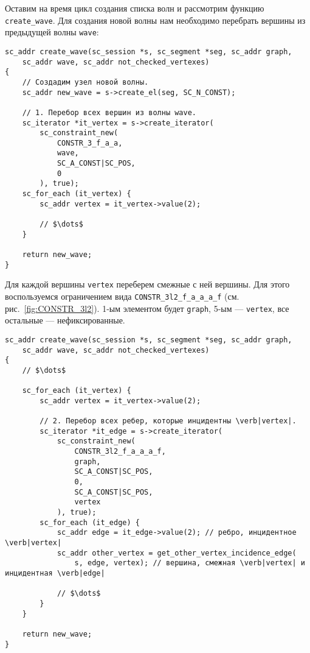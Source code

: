 Оставим на время цикл создания списка волн и рассмотрим функцию
\lstinline|create_wave|. Для создания новой волны нам необходимо
перебрать вершины из предыдущей волны \lstinline|wave|:

\begin{lstlisting}[texcl]
sc_addr create_wave(sc_session *s, sc_segment *seg, sc_addr graph,
    sc_addr wave, sc_addr not_checked_vertexes)
{
    // Создадим узел новой волны.
    sc_addr new_wave = s->create_el(seg, SC_N_CONST);

    // 1. Перебор всех вершин из волны wave.
    sc_iterator *it_vertex = s->create_iterator(
        sc_constraint_new(
            CONSTR_3_f_a_a,
            wave,
            SC_A_CONST|SC_POS,
            0
        ), true);
    sc_for_each (it_vertex) {
        sc_addr vertex = it_vertex->value(2);

        // $\dots$
    }

    return new_wave;
}
\end{lstlisting}

Для каждой вершины \lstinline|vertex| переберем смежные с ней
вершины. Для этого воспользуемся ограничением вида
\lstinline|CONSTR_3l2_f_a_a_a_f| (см. рис.~\ref{fig:CONSTR_3l2}). 1-ым
элементом будет \lstinline|graph|, 5-ым --- \lstinline|vertex|, все
остальные --- нефиксированные.

\begin{lstlisting}[texcl,label={lst:create_wave_for_each_adj}]
sc_addr create_wave(sc_session *s, sc_segment *seg, sc_addr graph,
    sc_addr wave, sc_addr not_checked_vertexes)
{
    // $\dots$

    sc_for_each (it_vertex) {
        sc_addr vertex = it_vertex->value(2);

        // 2. Перебор всех ребер, которые инцидентны \verb|vertex|.
        sc_iterator *it_edge = s->create_iterator(
            sc_constraint_new(
                CONSTR_3l2_f_a_a_a_f,
                graph,
                SC_A_CONST|SC_POS,
                0,
                SC_A_CONST|SC_POS,
                vertex
            ), true);
        sc_for_each (it_edge) {
            sc_addr edge = it_edge->value(2); // ребро, инцидентное  \verb|vertex|
            sc_addr other_vertex = get_other_vertex_incidence_edge(
                s, edge, vertex); // вершина, смежная \verb|vertex| и инцидентная \verb|edge|

            // $\dots$
        }
    }

    return new_wave;
}
\end{lstlisting}

